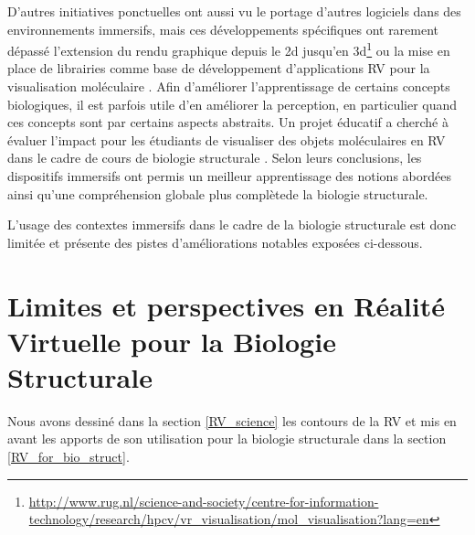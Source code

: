 D'autres initiatives ponctuelles ont aussi vu le portage d'autres logiciels dans des environnements immersifs, mais ces développements spécifiques ont rarement dépassé l'extension du rendu graphique depuis le 2d jusqu'en 3d\footnote{\url{http://www.rug.nl/science-and-society/centre-for-information-technology/research/hpcv/vr\_visualisation/mol\_visualisation?lang=en}} ou la mise en place de librairies comme base de développement d'applications RV pour la visualisation moléculaire \cite{salvadori_moka:_2014}.  Afin d'améliorer l'apprentissage de certains concepts biologiques, il est parfois utile d'en améliorer la perception, en particulier quand ces concepts sont par certains aspects abstraits. Un projet éducatif a cherché à évaluer l'impact pour les étudiants de visualiser des objets moléculaires en RV dans le cadre de cours de biologie structurale \cite{tan_use_2013}. Selon leurs conclusions, les dispositifs immersifs ont permis un meilleur apprentissage des notions abordées ainsi qu'une compréhension globale plus complètede la biologie structurale.

L'usage des contextes immersifs dans le cadre de la biologie structurale est donc limitée et présente des pistes d'améliorations notables exposées ci-dessous.



\section{Limites et perspectives en Réalité Virtuelle pour la Biologie Structurale} %
\label{sec:RV_perspectives}

Nous avons dessiné dans la section \ref{RV_science} les contours de la RV et mis en avant les apports de son utilisation pour la biologie structurale dans la section \ref{RV_for_bio_struct}. 




